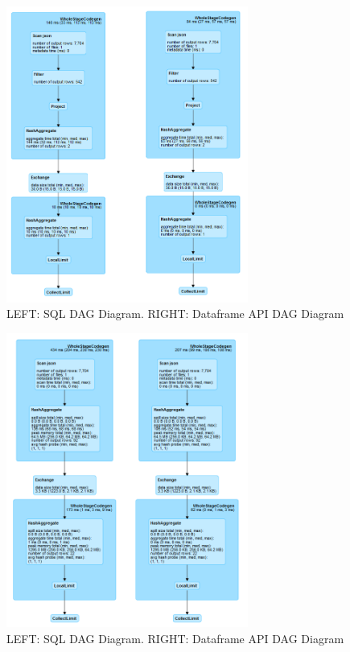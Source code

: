 \documentclass[]{article}
\begin{document}
\begin{figure}[h]

{\centering \includegraphics[width=300px]{images/query1} 

}

\caption{\label{fig:figs}LEFT: SQL DAG Diagram. RIGHT: Dataframe API DAG Diagram}\label{fig:unnamed-chunk-7}
\end{figure}

\begin{figure}[h]

{\centering \includegraphics[width=300px]{images/query2} 

}

\caption{\label{fig:figs}LEFT: SQL DAG Diagram. RIGHT: Dataframe API DAG Diagram}\label{fig:unnamed-chunk-8}
\end{figure}
\end{document}
